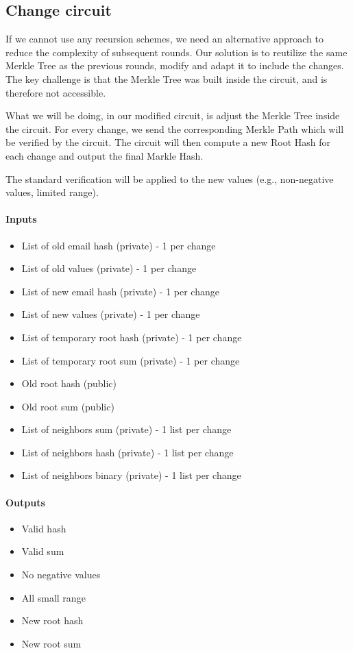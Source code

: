 \subsection{Change circuit}
If we cannot use any recursion schemes, we need an alternative approach to reduce the complexity of subsequent rounds.
Our solution is to reutilize the same Merkle Tree as the previous rounds, modify  and adapt it to include the changes.
The key challenge is that the Merkle Tree was built inside the circuit, and is therefore not accessible.

What we will be doing, in our modified circuit, is adjust the Merkle Tree inside the circuit.
For every change, we send the corresponding Merkle Path which will be verified by the circuit.
The circuit will then compute a new Root Hash for each change and output the final Markle Hash.

The standard verification will be applied to the new values (e.g., non-negative values, limited range).

\paragraph{Inputs}
\begin{itemize}
   \item List of old email hash (private) - 1 per change
   \item List of old values (private) - 1 per change
   \item List of new email hash (private) - 1 per change
   \item List of new values (private) - 1 per change
   \item List of temporary root hash (private) - 1 per change
   \item List of temporary root sum (private) - 1 per change
   \item Old root hash (public)
   \item Old root sum (public)
   \item List of neighbors sum (private) - 1 list per change
   \item List of neighbors hash (private) - 1 list per change
   \item List of neighbors binary (private) - 1 list per change
   \end{itemize}

   \paragraph{Outputs}
   \begin{itemize}
       \item Valid hash
       \item Valid sum
       \item No negative values
       \item All small range
       \item New root hash 
       \item New root sum
       \end{itemize}

